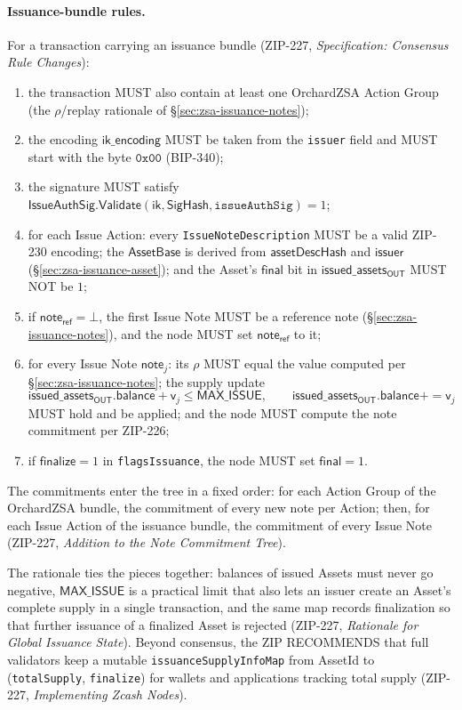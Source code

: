 \documentclass[11pt,a4paper]{article}
\theoremstyle{definition}
\begin{document}
\paragraph{Issuance-bundle rules.} For a transaction carrying an
issuance bundle (ZIP-227, \emph{Specification: Consensus Rule Changes}):
\begin{enumerate}[label=(I\arabic*)]
\item the transaction MUST also contain at least one OrchardZSA Action
  Group (the $\rho$/replay rationale of
  \S\ref{sec:zsa-issuance-notes});
\item the encoding $\mathsf{ik\_encoding}$ MUST be taken from the
  \texttt{issuer} field and MUST start with the byte $\mathtt{0x00}$
  (BIP-340);
\item the signature MUST satisfy
  $\mathsf{IssueAuthSig.Validate}(\mathsf{ik}, \mathsf{SigHash},
  \mathtt{issueAuthSig}) = 1$;
\item for each Issue Action: every \texttt{IssueNoteDescription} MUST be
  a valid ZIP-230 encoding; the $\mathsf{AssetBase}$ is derived from
  $\mathsf{assetDescHash}$ and $\mathsf{issuer}$
  (\S\ref{sec:zsa-issuance-asset}); and the Asset's $\mathsf{final}$
  bit in $\mathsf{issued\_assets_{OUT}}$ MUST NOT be $1$;
\item if $\mathsf{note_{ref}} = \bot$, the first Issue Note MUST be a
  reference note (\S\ref{sec:zsa-issuance-notes}), and the node MUST set
  $\mathsf{note_{ref}}$ to it;
\item for every Issue Note $\mathsf{note}_j$: its $\rho$ MUST equal the
  value computed per \S\ref{sec:zsa-issuance-notes}; the supply update
  \[
  \mathsf{issued\_assets_{OUT}}.\mathsf{balance} + \mathsf{v}_j
  \le \mathsf{MAX\_ISSUE}, \qquad
  \mathsf{issued\_assets_{OUT}}.\mathsf{balance} \mathrel{{+}{=}}
  \mathsf{v}_j
  \]
  MUST hold and be applied; and the node MUST compute the note
  commitment per ZIP-226;
\item if $\mathsf{finalize} = 1$ in \texttt{flagsIssuance}, the node
  MUST set $\mathsf{final} = 1$.
\end{enumerate}
The commitments enter the tree in a fixed order: for each Action Group
of the OrchardZSA bundle, the commitment of every new note per Action;
then, for each Issue Action of the issuance bundle, the commitment of
every Issue Note (ZIP-227, \emph{Addition to the Note Commitment Tree}).

The rationale ties the pieces together: balances of issued Assets must
never go negative, $\mathsf{MAX\_ISSUE}$ is a practical limit that also
lets an issuer create an Asset's complete supply in a single transaction,
and the same map records finalization so that further issuance of a
finalized Asset is rejected (ZIP-227, \emph{Rationale for Global
Issuance State}). Beyond consensus, the ZIP RECOMMENDS that full
validators keep a mutable \texttt{issuanceSupplyInfoMap} from AssetId to
(\texttt{totalSupply}, \texttt{finalize}) for wallets and applications
tracking total supply (ZIP-227, \emph{Implementing Zcash Nodes}).
\end{document}
